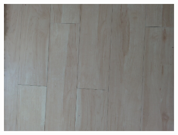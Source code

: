 \begin{figure}[h!t]
\begin{subfigure}[b]{0.25\textwidth}
    \end{subfigure}%
    \begin{subfigure}[b]{0.25\textwidth}
        \centering
        \includegraphics[width=0.9\linewidth]{images/materials/wood-cam}
    \end{subfigure}%


\end{figure}
